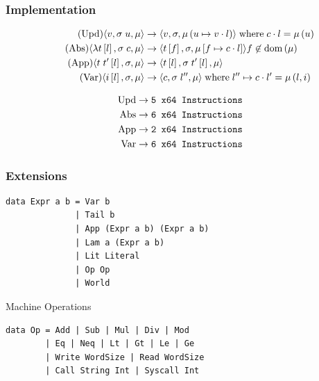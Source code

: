 \documentclass[14pt,mathserif]{beamer}
\begin{document}
\begin{frame}
\frametitle{Implementation}
\footnotesize
\begin{align*}
\tag{Upd}
\langle v,  \sigma \; u , \mu \rangle 
  &\rightarrow
\langle v, \sigma, \mu\left(u \mapsto v \cdot l\right) \rangle  
\; \textnormal{where} \; c \cdot l = \mu\left(u\right) \\
\tag{Abs}
\langle \lambda t\left[l\right], \sigma \; c, \mu \rangle 
  &\rightarrow
\langle t\left[f\right], \sigma, \mu\left[f \mapsto c \cdot l\right]\rangle f
\not \in \textnormal{dom}\left(\mu\right)  \\
\tag{App}
\langle t \; t'\left[l\right], \sigma, \mu \rangle
  &\rightarrow
\langle t\left[l\right], \sigma \; t'\left[l\right], \mu \rangle \\
\tag{Var}
\langle i\left[l\right], \sigma, \mu \rangle
  &\rightarrow
\langle c, \sigma \; l'', \mu \rangle
\; \textnormal{where} \; l'' \mapsto c \cdot l' = \mu\left(l, i\right)
\end{align*}

\begin{align*}
\textmd{Upd} &\rightarrow \texttt{5 x64 Instructions} \\
\textmd{Abs} &\rightarrow \texttt{6 x64 Instructions} \\
\textmd{App} &\rightarrow \texttt{2 x64 Instructions} \\
\textmd{Var} &\rightarrow \texttt{6 x64 Instructions} \\
\end{align*}
\end{frame}

\begin{frame}[fragile]
\frametitle{Extensions}
\small
\begin{lstlisting}
data Expr a b = Var b 
              | Tail b
              | App (Expr a b) (Expr a b) 
              | Lam a (Expr a b)
              | Lit Literal
              | Op Op
              | World
\end{lstlisting}
\end{frame}

\begin{frame}[fragile]{Machine Operations}
\small
\begin{lstlisting}
data Op = Add | Sub | Mul | Div | Mod 
        | Eq | Neq | Lt | Gt | Le | Ge 
        | Write WordSize | Read WordSize 
        | Call String Int | Syscall Int 
\end{lstlisting}
\end{frame}
\end{document}
